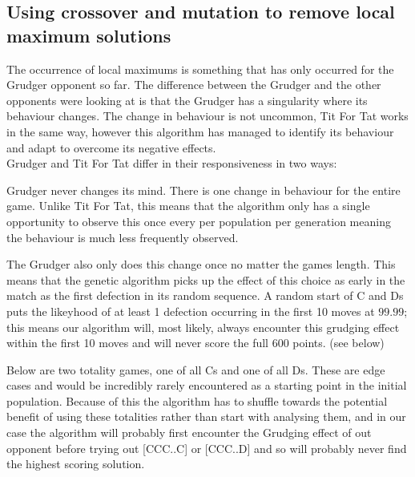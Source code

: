             \subsection{Using crossover and mutation to remove local maximum solutions}

            The occurrence of local maximums is something that has only occurred for the Grudger opponent so far. The difference between the Grudger and the other opponents were looking at is that the Grudger has a singularity where its behaviour changes. The change in behaviour is not uncommon, Tit For Tat works in the same way, however this algorithm has managed to identify its behaviour and adapt to overcome its negative effects.\\
            
            Grudger and Tit For Tat differ in their responsiveness in two ways: 
            
            \begin{itemize}
                \begin{item}
                    Grudger never changes its mind. There is one change in behaviour for the entire game. Unlike Tit For Tat, this means that the algorithm only has a single opportunity to observe this once every per population per generation meaning the behaviour is much less frequently observed.
                \end{item}
                
                \begin{item}
                    The Grudger also only does this change once no matter the games length. This means that the genetic algorithm picks up the effect of this choice as early in the match as the first defection in its random sequence. A random start of C and Ds puts the likeyhood of at least 1 defection occurring in the first 10 moves at \(99.99\); this means our algorithm will, most likely, always encounter this grudging effect within the first 10 moves and will never score the full 600 points. (see below)
                \end{item}
            \end{itemize}
            
            Below are two totality games, one of all Cs and one of all Ds. These are edge cases and would be incredibly rarely encountered as a starting point in the initial population. Because of this the algorithm has to shuffle towards the potential benefit of using these totalities rather than start with analysing them, and in our case the algorithm will probably first encounter the Grudging effect of out opponent before trying out [CCC..C] or [CCC..D] and so will probably never find the highest scoring solution.

